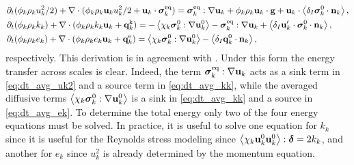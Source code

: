 \begin{align}
    \label{eq:dt_avg_uk2}
    &\pddt (\phi_k \rho_ku_k^2/2)  
    + \div (
        \phi_k \rho_k\textbf{u}_ku_k^2/2
        + \textbf{u}_k \cdot \bm{\sigma}_k^\text{eq}
    )
    = 
    \bm{\sigma}_k^\text{eq} : \grad \textbf{u}_k
    + \phi_k \rho_k \textbf{u}_k\cdot \textbf{g} 
    +  \textbf{u}_k\cdot \avg{\delta_I \bm{\sigma}_k^0 \cdot \textbf{n}_k},\\
    \label{eq:dt_avg_kk}
    &\pddt (\phi_k\rho_kk_k)  
    + \div (
        \phi_k\rho_kk_k\textbf{u}_k
        + \textbf{q}_k^\text{k} 
        )
    = 
    - \avg{\chi_k\bm{\sigma}_k^0 : \grad \textbf{u}_k^0}
    - \bm{\sigma}_k^\text{eq} : \grad \textbf{u}_k
    + \avg{\delta_I \textbf{u}_k' \cdot \bm{\sigma}_k^0 \cdot \textbf{n}_k},\\
    \label{eq:dt_avg_ek}
    &\pddt (\phi_k\rho_ke_k)  
    + \div (
        \phi_k \rho_ke_k\textbf{u}_k
        +
        \textbf{q}_k^\text{e} 
        )
    = 
    \avg{\chi_k\bm{\sigma}_k^0 : \grad \textbf{u}_k^0}
    - \avg{\delta_I \textbf{q}_k^0 \cdot \textbf{n}_k},
\end{align}
respectively. 
This derivation is in agreement with \citet{morel2015mathematical}. 
Under this form the energy transfer across scales is clear. 
Indeed, the term $\bm{\sigma}_k^\text{eq} : \mathbf{\nabla} \textbf{u}_k$ acts as a sink term in \ref{eq:dt_avg_uk2} and a source term in \ref{eq:dt_avg_kk}, while the averaged diffusive terms $\left<\chi_k\bm{\sigma}_k^0 : \mathbf{\nabla} \textbf{u}_k^0\right>$ is a sink in \ref{eq:dt_avg_kk} and a source in \ref{eq:dt_avg_ek}. 
To determine the total energy only two of the four energy equations must be solved. 
In practice, it is useful to solve one equation for $k_k$ since it is useful for the Reynolds stress modeling since $\left<\chi_k \textbf{u}_k^0 \textbf{u}_k^0\right>: \bm\delta = 2 k_k$, and another for $e_k$ since $u_k^2$ is already determined by the momentum equation. 

